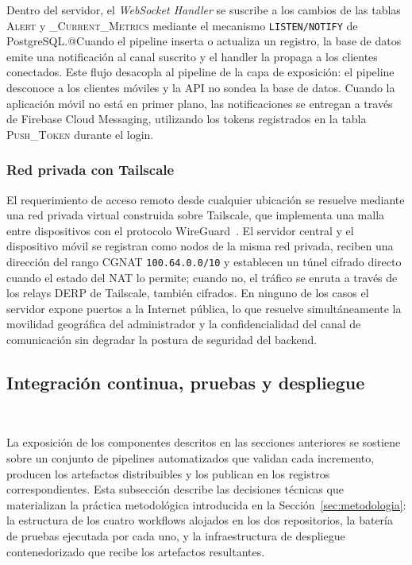 Dentro del servidor, el \textit{WebSocket Handler} se suscribe a 
los cambios de las tablas \textsc{Alert} y 
\textsc{\_Current\_Metrics} mediante el mecanismo 
\texttt{LISTEN/NOTIFY} de PostgreSQL.@Cuando el pipeline inserta o 
actualiza un registro, la base de datos emite una notificación al 
canal suscrito y el handler la propaga a los clientes conectados. 
Este flujo desacopla al pipeline de la capa de exposición: el 
pipeline desconoce a los clientes móviles y la API no sondea la 
base de datos. Cuando la aplicación móvil no está en primer plano, 
las notificaciones se entregan a través de Firebase Cloud 
Messaging, utilizando los tokens registrados en la tabla 
\textsc{Push\_Token} durante el login.

\subsubsection{Red privada con Tailscale}

El requerimiento de acceso remoto desde cualquier ubicación se 
resuelve mediante una red privada virtual construida sobre 
Tailscale, que implementa una malla entre dispositivos con el 
protocolo WireGuard~\cite{donenfeld2017wireguard}. El servidor 
central y el dispositivo móvil se registran como nodos de la misma 
red privada, reciben una dirección del rango CGNAT 
\texttt{100.64.0.0/10} y establecen un túnel cifrado directo 
cuando el estado del NAT lo permite; cuando no, el tráfico se 
enruta a través de los relays DERP de Tailscale, también cifrados. 
En ninguno de los casos el servidor expone puertos a la Internet 
pública, lo que resuelve simultáneamente la movilidad geográfica 
del administrador y la confidencialidad del canal de comunicación 
sin degradar la postura de seguridad del backend.

\subsection{Integración continua, pruebas y despliegue}
~\label{subsec:cicd}

La exposición de los componentes descritos en las secciones
anteriores se sostiene sobre un conjunto de pipelines automatizados
que validan cada incremento, producen los artefactos distribuibles
y los publican en los registros correspondientes. Esta subsección
describe las decisiones técnicas que materializan la práctica
metodológica introducida en la Sección~\ref{sec:metodologia}: la
estructura de los cuatro workflows alojados en los dos repositorios,
la batería de pruebas ejecutada por cada uno, y la infraestructura
de despliegue contenedorizado que recibe los artefactos resultantes.

